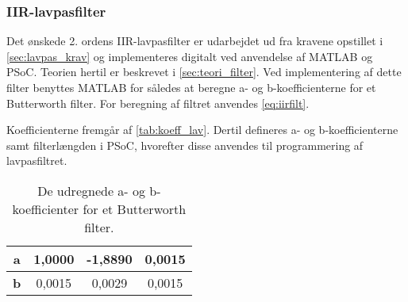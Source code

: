 \subsubsection{IIR-lavpasfilter}
Det ønskede 2. ordens IIR-lavpasfilter er udarbejdet ud fra kravene opstillet i \autoref{sec:lavpas_krav}  og implementeres digitalt ved anvendelse af MATLAB og PSoC. 
Teorien hertil er beskrevet i \autoref{sec:teori_filter}. 
Ved implementering af dette filter benyttes MATLAB for således at beregne a- og b-koefficienterne for et Butterworth filter. 
For beregning af filtret anvendes \autoref{eq:iirfilt}. 

Koefficienterne fremgår af \autoref{tab:koeff_lav}. Dertil defineres a- og b-koefficienterne samt filterlængden i PSoC, hvorefter disse anvendes til programmering af lavpasfiltret. 

\begin{table}[H]
\centering
\begin{tabular}{|c|c|c|c|}
\hline
\textbf{a} & 1,0000 & -1,8890 & 0,0015 \\ \hline
\textbf{b} & 0,0015 & 0,0029  & 0,0015 \\ \hline
\end{tabular}
\caption{De udregnede a- og b-koefficienter for et Butterworth filter.}
\label{tab:koeff_lav}
\end{table}